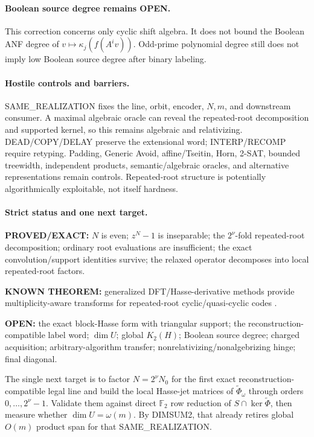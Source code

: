 \documentclass[11pt]{article}
\begin{document}
\paragraph{Boolean source degree remains OPEN.}
This correction concerns only cyclic shift algebra. It does not bound the Boolean ANF degree of \(v\mapsto\kappa_j(f(A^iv))\). Odd-prime polynomial degree still does not imply low Boolean source degree after binary labeling.

\paragraph{Hostile controls and barriers.}
SAME\_REALIZATION fixes the line, orbit, encoder, \(N,m\), and downstream consumer. A maximal algebraic oracle can reveal the repeated-root decomposition and supported kernel, so this remains algebraic and relativizing. DEAD/COPY/DELAY preserve the extensional word; INTERP/RECOMP require retyping. Padding, Generic Avoid, affine/Tseitin, Horn, 2-SAT, bounded treewidth, independent products, semantic/algebraic oracles, and alternative representations remain controls. Repeated-root structure is potentially algorithmically exploitable, not itself hardness.

\paragraph{Strict status and one next target.}
\textbf{PROVED/EXACT:} \(N\) is even; \(z^N-1\) is inseparable; the \(2^\nu\)-fold repeated-root decomposition; ordinary root evaluations are insufficient; the exact convolution/support identities survive; the relaxed operator decomposes into local repeated-root factors.

\textbf{KNOWN THEOREM:} generalized DFT/Hasse-derivative methods provide multiplicity-aware transforms for repeated-root cyclic/quasi-cyclic codes \cite{LingNiederreiterSole,GenMS}.

\textbf{OPEN:} the exact block-Hasse form with triangular support; the reconstruction-compatible label word; \(\dim U\); global \(K_2(H)\); Boolean source degree; charged acquisition; arbitrary-algorithm transfer; nonrelativizing/nonalgebrizing hinge; final diagonal.

The single next target is to factor \(N=2^\nu N_0\) for the first exact reconstruction-compatible legal line and build the local Hasse-jet matrices of \(\widetilde\Phi_\omega\) through orders \(0,\ldots,2^\nu-1\). Validate them against direct \(\mathbb F_2\) row reduction of \(S\cap\ker\widetilde\Phi\), then measure whether \(\dim U=\omega(m)\). By DIMSUM2, that already retires global \(O(m)\) product span for that SAME\_REALIZATION.
\end{document}

